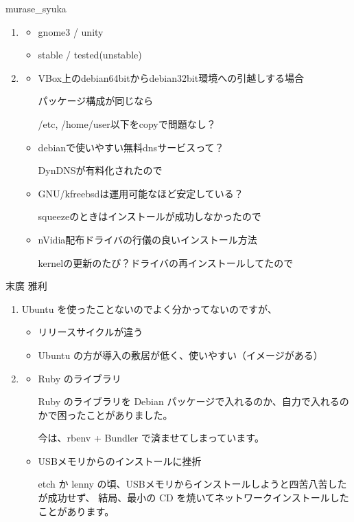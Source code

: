 \documentclass[mingoth,a4paper]{jsarticle}
\begin{document}
\begin{prework}{ murase\_{}syuka }
  \begin{enumerate}
  \item 
    \begin{itemize}
    \item gnome3 / unity
    \item stable / tested(unstable)
    \end{itemize}
  \item 
    \begin{itemize}
    \item VBox上のdebian64bitからdebian32bit環境への引越しする場合

      パッケージ構成が同じなら

      /etc, /home/user以下をcopyで問題なし？
    \item debianで使いやすい無料dnsサービスって？

      DynDNSが有料化されたので
    \item GNU/kfreebsdは運用可能なほど安定している？

      squeezeのときはインストールが成功しなかったので
    \item nVidia配布ドライバの行儀の良いインストール方法

      kernelの更新のたび？ドライバの再インストールしてたので
    \end{itemize}
  \end{enumerate}
\end{prework}

\begin{prework}{ 末廣 雅利 }
  \begin{enumerate}
  \item Ubuntu を使ったことないのでよく分かってないのですが、
    \begin{itemize}
    \item リリースサイクルが違う
    \item Ubuntu の方が導入の敷居が低く、使いやすい（イメージがある）
    \end{itemize}
  \item 
    \begin{itemize}
    \item Ruby のライブラリ

      Ruby のライブラリを Debian パッケージで入れるのか、自力で入れるのかで困ったことがありました。

      今は、rbenv + Bundler で済ませてしまっています。
    \item USBメモリからのインストールに挫折

      etch か lenny の頃、USBメモリからインストールしようと四苦八苦したが成功せず、
      結局、最小の CD を焼いてネットワークインストールしたことがあります。
    \end{itemize}
  \end{enumerate}
\end{prework}
\end{document}
